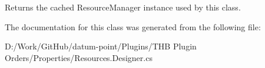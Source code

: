 Returns the cached Resource\+Manager instance used by this class. 



The documentation for this class was generated from the following file\+:\begin{DoxyCompactItemize}
\item 
D\+:/\+Work/\+Git\+Hub/datum-\/point/\+Plugins/\+T\+H\+B Plugin Orders/\+Properties/Resources.\+Designer.\+cs\end{DoxyCompactItemize}
